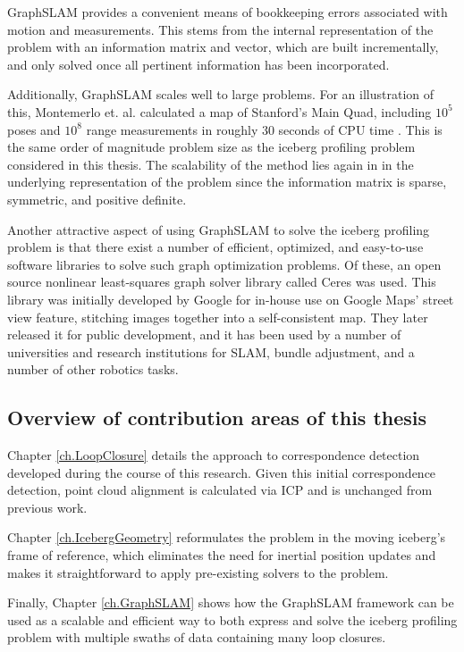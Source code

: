 GraphSLAM provides a convenient means of bookkeeping errors associated with motion and measurements. This stems from the internal representation of the problem with an information matrix and vector, which are built incrementally, and only solved once all pertinent information has been incorporated. 


Additionally, GraphSLAM scales well to large problems. For an illustration of this, Montemerlo et. al. calculated a map of Stanford's Main Quad, including $10^5$ poses and $10^8$ range measurements in roughly 30 seconds of CPU time \cite{Thrun2005}. This is the same order of magnitude problem size as the iceberg profiling problem considered in this thesis. The scalability of the method lies again in in the underlying representation of the problem since the information matrix is sparse, symmetric, and positive definite.

Another attractive aspect of using GraphSLAM to solve the iceberg profiling problem is that there exist a number of efficient, optimized, and easy-to-use software libraries to solve such graph optimization problems. Of these, an open source nonlinear least-squares graph solver library called Ceres was used. This library was initially developed by Google for in-house use on Google Maps' street view feature, stitching images together into a self-consistent map. They later released it for public development, and it has been used by a number of universities and research institutions for SLAM, bundle adjustment, and a number of other robotics tasks. \cite{Agarwal2012}

\subsection{Overview of contribution areas of this thesis}

Chapter \ref{ch.LoopClosure} details the approach to correspondence detection developed during the course of this research. Given this initial correspondence detection, point cloud alignment is calculated via ICP and is unchanged from previous work.

Chapter \ref{ch.IcebergGeometry} reformulates the problem in the moving iceberg's frame of reference, which eliminates the need for inertial position updates and makes it straightforward to apply pre-existing solvers to the problem.

Finally, Chapter \ref{ch.GraphSLAM} shows how the GraphSLAM framework can be used as a scalable and efficient way to both express and solve the iceberg profiling problem with multiple swaths of data containing many loop closures.


